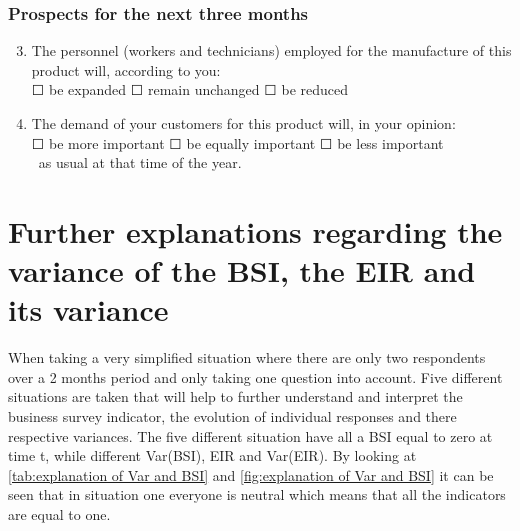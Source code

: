 \documentclass[12pt,a4paper,oneside]{book}
\begin{document}
\subsubsection*{Prospects for the next three months} 
\begin{enumerate}
\setcounter{enumi}{2}
    \item The personnel (workers and technicians) employed for the manufacture of this product will, according to you: \\
    $\Square$ be expanded $\Square$ remain unchanged $\Square$ be reduced
                        
    \item The demand of your customers for this product will, in your opinion:  \\
    $\Square$ be more important $\Square$ be equally important $\Square$ be less important \\\    
    as usual at that time of the year.
\end{enumerate}





\newpage
\section{Further explanations regarding the variance of the BSI, the EIR and its variance}
\label{chap:appendix:explain Var BSI and EIR}

When taking a very simplified situation where there are only two respondents over a 2 months period and only taking one question into account. 
Five different situations are taken that will help to further understand and interpret the business survey indicator, the evolution of individual responses and there respective variances.
The five different situation have all a BSI equal to zero at time t, while different Var(BSI), EIR and Var(EIR). 
By looking at \autoref{tab:explanation of Var and BSI} and \autoref{fig:explanation of Var and BSI} it can be seen that in situation one everyone is neutral which means that all the indicators are equal to one.
\end{document}

